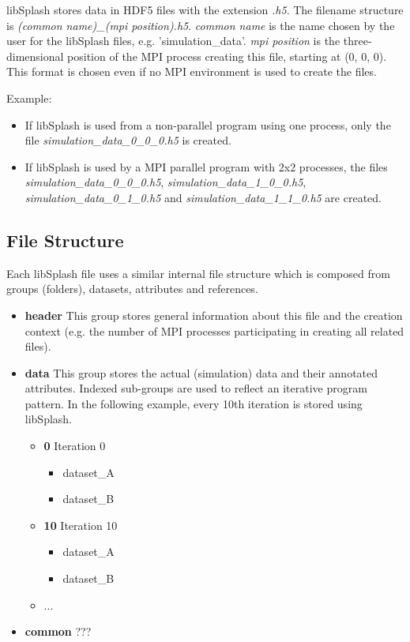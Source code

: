 \documentclass[a4paper,10pt,BCOR12mm]{report}
\begin{document}
libSplash stores data in HDF5 files with the extension \emph{.h5}.
The filename structure is \emph{(common name)\_(mpi position).h5}.
\emph{common name} is the name chosen by the user for the libSplash files, e.g.
'simulation\_data'.
\emph{mpi position} is the three-dimensional position of the MPI process creating this
file, starting at (0, 0, 0).
This format is chosen even if no MPI environment is used to create the files.

Example:
\begin{itemize}
	\item If libSplash is used from a non-parallel program using one process, only the file \emph{simulation\_data\_0\_0\_0.h5} is created.

	\item If libSplash is used by a MPI parallel program with 2x2 processes, the files
	\emph{simulation\_data\_0\_0\_0.h5}, \emph{simulation\_data\_1\_0\_0.h5},
	\emph{simulation\_data\_0\_1\_0.h5} and \emph{simulation\_data\_1\_1\_0.h5} are created.
\end{itemize}

\subsection{File Structure}

Each libSplash file uses a similar internal file structure which is composed from groups (folders),
datasets, attributes and references.

\begin{itemize}
	\item \textbf{header}
	This group stores general information about this file and the creation context (e.g.
	the number of MPI processes participating in creating all related files).

	\item \textbf{data}
	This group stores the actual (simulation) data and their annotated attributes. Indexed
	sub-groups are used to reflect an iterative program pattern. In the following example, every 10th
	iteration is stored using libSplash.
	\begin{itemize}
		\item \textbf{0}
		Iteration 0
		\begin{itemize}
			\item dataset\_A
			\item dataset\_B
		\end{itemize}

		\item \textbf{10}
		Iteration 10
		\begin{itemize}
			\item dataset\_A
			\item dataset\_B
		\end{itemize}

		\item ...
	\end{itemize}

	\item \textbf{common}
	???
\end{itemize}
\end{document}
